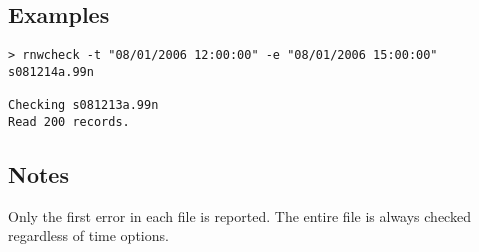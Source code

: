 \subsection{Examples}
\begin{\outputsize}
\begin{verbatim}
> rnwcheck -t "08/01/2006 12:00:00" -e "08/01/2006 15:00:00" s081214a.99n

Checking s081213a.99n
Read 200 records.
\end{verbatim}
\end{\outputsize}
\subsection{Notes}
Only the first error in each file is reported. The entire file is always checked regardless of time options.

%

